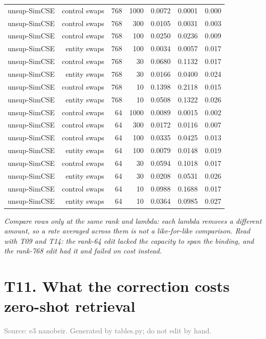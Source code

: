 \documentclass[10pt]{article}
\begin{document}
\begin{longtable}{lrrrrrr}
unsup-SimCSE & control swaps & 768 & 1000 & 0.0072 & 0.0001 & 0.000 \\
unsup-SimCSE & control swaps & 768 & 300 & 0.0105 & 0.0031 & 0.003 \\
unsup-SimCSE & control swaps & 768 & 100 & 0.0250 & 0.0236 & 0.009 \\
unsup-SimCSE & entity swaps & 768 & 100 & 0.0034 & 0.0057 & 0.017 \\
unsup-SimCSE & control swaps & 768 & 30 & 0.0680 & 0.1132 & 0.017 \\
unsup-SimCSE & entity swaps & 768 & 30 & 0.0166 & 0.0400 & 0.024 \\
unsup-SimCSE & control swaps & 768 & 10 & 0.1398 & 0.2118 & 0.015 \\
unsup-SimCSE & entity swaps & 768 & 10 & 0.0508 & 0.1322 & 0.026 \\
unsup-SimCSE & control swaps & 64 & 1000 & 0.0089 & 0.0015 & 0.002 \\
unsup-SimCSE & control swaps & 64 & 300 & 0.0172 & 0.0116 & 0.007 \\
unsup-SimCSE & control swaps & 64 & 100 & 0.0335 & 0.0425 & 0.013 \\
unsup-SimCSE & entity swaps & 64 & 100 & 0.0079 & 0.0148 & 0.019 \\
unsup-SimCSE & control swaps & 64 & 30 & 0.0594 & 0.1018 & 0.017 \\
unsup-SimCSE & entity swaps & 64 & 30 & 0.0208 & 0.0531 & 0.026 \\
unsup-SimCSE & control swaps & 64 & 10 & 0.0988 & 0.1688 & 0.017 \\
unsup-SimCSE & entity swaps & 64 & 10 & 0.0364 & 0.0985 & 0.027 \\
\end{longtable}
\normalsize

\textit{Compare rows only at the same rank and lambda: each lambda removes a different amount, so a rate averaged across them is not a like-for-like comparison. Read with T09 and T14: the rank-64 edit lacked the capacity to span the binding, and the rank-768 edit had it and failed on cost instead.}
\clearpage

\section*{T11. What the correction costs zero-shot retrieval}
\textcolor{gray}{Source: e3 nanobeir. Generated by tables.py; do not edit by hand.}
\end{document}
